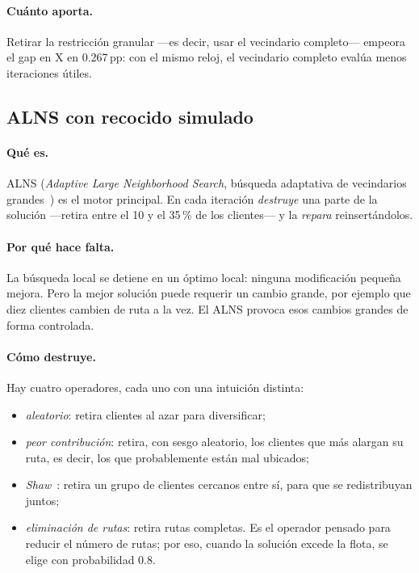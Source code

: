 \documentclass[11pt,a4paper]{article}
\newcommand{\pp}{\,pp}
\begin{document}
\paragraph{Cuánto aporta.} Retirar la restricción granular ---es decir, usar el vecindario
completo--- empeora el gap en X en 0.267\pp{}: con el mismo reloj, el vecindario completo evalúa
menos iteraciones útiles.

\subsection{ALNS con recocido simulado}
\label{sec:alns}

\paragraph{Qué es.} ALNS (\emph{Adaptive Large Neighborhood Search}, búsqueda adaptativa de
vecindarios grandes~\cite{shaw1998,ropke2006}) es el motor principal. En cada iteración
\emph{destruye} una parte de la solución ---retira entre el 10 y el 35\,\% de los clientes--- y la
\emph{repara} reinsertándolos.

\paragraph{Por qué hace falta.} La búsqueda local se detiene en un óptimo local: ninguna modificación
pequeña mejora. Pero la mejor solución puede requerir un cambio grande, por ejemplo que diez clientes
cambien de ruta a la vez. El ALNS provoca esos cambios grandes de forma controlada.

\paragraph{Cómo destruye.} Hay cuatro operadores, cada uno con una intuición distinta:
\begin{itemize}[leftmargin=1.5em]
\item \emph{aleatorio}: retira clientes al azar para diversificar;
\item \emph{peor contribución}: retira, con sesgo aleatorio, los clientes que más alargan su ruta,
es decir, los que probablemente están mal ubicados;
\item \emph{Shaw}~\cite{shaw1998}: retira un grupo de clientes cercanos entre sí, para que se
redistribuyan juntos;
\item \emph{eliminación de rutas}: retira rutas completas. Es el operador pensado para reducir el
número de rutas; por eso, cuando la solución excede la flota, se elige con probabilidad 0.8.
\end{itemize}
\end{document}
